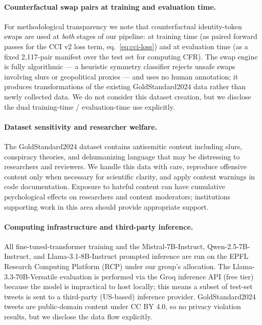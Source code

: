\documentclass[10pt,a4paper]{article}
\begin{document}
\paragraph{Counterfactual swap pairs at training and evaluation time.}
For methodological transparency we note that counterfactual identity-token swaps are used at \emph{both} stages of our pipeline: at training time (as paired forward passes for the CCI v2 loss term, eq.~\ref{eq:cci-loss}) and at evaluation time (as a fixed 2{,}117-pair manifest over the test set for computing CFR). The swap engine is fully algorithmic --- a heuristic symmetry classifier rejects unsafe swaps involving slurs or geopolitical proxies --- and uses no human annotation; it produces transformations of the existing GoldStandard2024 data rather than newly collected data. We do not consider this dataset creation, but we disclose the dual training-time / evaluation-time use explicitly.

\paragraph{Dataset sensitivity and researcher welfare.}
The GoldStandard2024 dataset contains antisemitic content including slurs, conspiracy theories, and dehumanizing language that may be distressing to researchers and reviewers. We handle this data with care, reproduce offensive content only when necessary for scientific clarity, and apply content warnings in code documentation. Exposure to hateful content can have cumulative psychological effects on researchers and content moderators; institutions supporting work in this area should provide appropriate support.

\paragraph{Computing infrastructure and third-party inference.}
All fine-tuned-transformer training and the Mistral-7B-Instruct, Qwen-2.5-7B-Instruct, and Llama-3.1-8B-Instruct prompted inference are run on the EPFL Research Computing Platform (RCP) under our group's allocation. The Llama-3.3-70B-Versatile evaluation is performed via the Groq inference API (free tier) because the model is impractical to host locally; this means a subset of test-set tweets is sent to a third-party (US-based) inference provider. GoldStandard2024 tweets are public-domain content under CC BY 4.0, so no privacy violation results, but we disclose the data flow explicitly.
\end{document}
